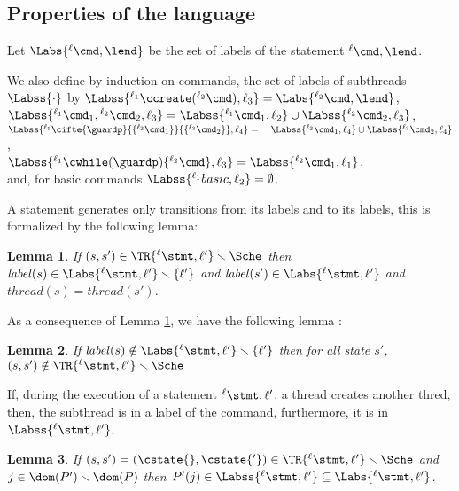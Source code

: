 \documentclass[12pt]{article}
\let\vide\emptyset \let\appartient\in
\let\firstunion\cup
\let\emptyset\vide \let\in\appartient
\let\cup\firstunion
\renewcommand{\subset}{\subseteq}
\newcommand{\lab}{  {}^{\ell}}
\newcommand{\li}[1]{ {}^{\ell_{#1}}  }
\newcounter{labels}[figure]
\newcommand{\lbl}{\mathit{label}}
\newcommand{\thread}{\mathit{thread}}
\newtheorem{lemma}{Lemma}
\begin{document}
\subsection{Properties of the language}\label{subsec:extensions}

Let \(\Labs{\lab \cmd,\lend}\) be the set of labels of the statement \(\lab \cmd,\lend\).

We also define by induction on commands, the set of labels of subthreads \(\Labss{\cdot}\) by \(\Labss{\li1\ccreate(\li2\cmd),\ell_3}=\Labs{\li2\cmd,\lend}\),\\
 \(\Labss{\li1\cmd_1,\li2\cmd_2,\ell_3} = 
 \Labss{\li1\cmd_1,\ell_2}
\cup 
 \Labss{\li2\cmd_2,\ell_3}
 \),\\
 \(\Labss{\li1\cifte{\guardp}{\{\li2\cmd_1\}}{\{\li3\cmd_2\}},\ell_4}=\\{}\quad\Labss{\li2\cmd_1,\ell_4}\cup\Labss{\li3\cmd_2,\ell_4}\),\\ \(\Labss{\li1\cwhile(\guardp)\{\li2\cmd\},\ell_3}=\Labss{\li2\cmd_1,\ell_1}\),\\
 and, for basic commands \(\Labss{\li1basic,\ell_2}=\emptyset\).

A statement generates only transitions from its labels and to its labels, this is formalized by the following lemma:

\begin{lemma}\label{lemma:A}
If \((s,s')\in\TR{\lab\stmt,\ell'}\smallsetminus \Sche\) then \(\lbl(s)\in\Labs{\lab\stmt,\ell'}\smallsetminus\{\ell'\}\) and \(\lbl(s')\in\Labs{\lab\stmt,\ell'}\) and \(\thread(s)=\thread(s')\).
\end{lemma}

As a consequence of Lemma \ref{lemma:A}, we have the following lemma :
\begin{lemma}
 \label{lemma:Abis}
 If \(\lbl(s)\notin \Labs{\lab \stmt ,\ell'}\smallsetminus\{\ell'\}\) then for all state \(s'\),  \((s,s')\notin\TR{\lab\stmt,\ell'}\smallsetminus \Sche\)
\end{lemma}

If, during the execution of a statement \(\lab\stmt,\ell'\), a thread creates another thred, then, the subthread is in a label of the command, furthermore, it is in \(\Labss{\lab\stmt,\ell'}\).
\begin{lemma}\label{lemma:Asub}
If \((s,s')=(\cstate{},\cstate{'})\in\TR{\lab\stmt,\ell'}\smallsetminus \Sche\) and \(j\in\dom(P')\smallsetminus\dom(P)\) then \(P'(j)\in \Labss{\lab\stmt,\ell'}\subset\Labs{\lab\stmt,\ell'}\).
\end{lemma}
\end{document}
